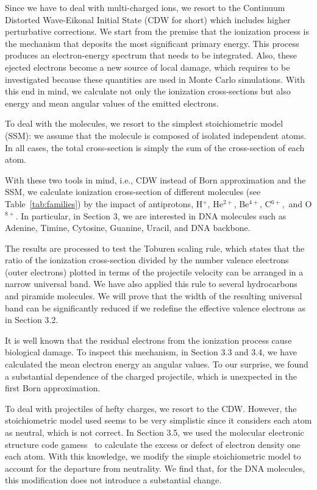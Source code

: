 \documentclass[preprint,showpacs,pra]{revtex4-1}
\begin{document}
Since we have to deal with multi-charged ions, we resort to the 
Continuum Distorted Wave-Eikonal Initial State (CDW for short) which 
includes higher perturbative corrections. We start from the premise 
that the ionization process is the mechanism that deposits the most 
significant primary energy. This process produces an electron-energy 
spectrum that needs to be integrated. Also, these ejected electrons 
become a new source of local damage, which requires to be investigated 
because these quantities are used in Monte Carlo simulations. With 
this end in mind, we calculate not only the ionization cross-sections 
but also energy and mean angular values of the emitted electrons.

To deal with the molecules, we resort to the simplest stoichiometric 
model (SSM): we assume that the molecule is composed of isolated 
independent atoms. In all cases, the total cross-section is simply 
the sum of the cross-section of each atom.

With these two tools in mind, i.e., CDW instead of Born approximation 
and the SSM, we calculate ionization cross-section of different 
molecules (see Table~\ref{tab:families}) by the impact of antiprotons,
H$^{+}$, He$^{2+}$, Be$^{4+}$, C$^{6+}$,\ and O$^{8+}$. In particular, 
in Section 3, we are interested in DNA molecules such as Adenine, 
Timine, Cytosine, Guanine, Uracil, and DNA backbone.

The results are processed to test the Toburen scaling rule, which 
states that the ratio of the ionization cross-section divided by 
the number valence electrons (outer electrons) plotted in terms of
the projectile velocity can be arranged in a narrow universal band.
We have also applied this rule to several hydrocarbons and piramide 
molecules. We will prove that the width of the resulting universal 
band can be significantly reduced if we redefine the effective valence 
electrons as in Section 3.2.

It is well known that the residual electrons from the ionization 
process cause biological damage. To inspect this mechanism, in 
Section 3.3 and 3.4, we have calculated the mean electron energy 
an angular values. To our surprise, we found a substantial dependence 
of the charged projectile, which is unexpected in the first 
Born approximation.

To deal with projectiles of hefty charges, we resort to the CDW. 
However, the stoichiometric model used seems to be very simplistic 
since it considers each atom as neutral, which is not correct. 
In Section 3.5, we used the molecular electronic structure code 
{\sc gamess}~\cite{gamess} to calculate the excess or defect of 
electron density one each atom. With this knowledge, we modify the 
simple stoichiometric model to account for the departure from 
neutrality. We find that, for the DNA molecules, this modification 
does not introduce a substantial change.
\end{document}
